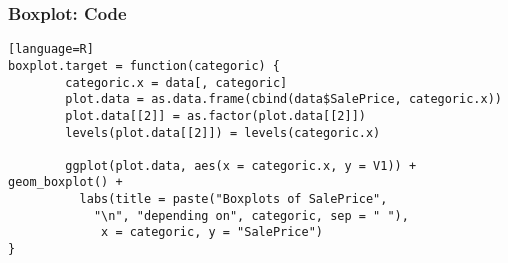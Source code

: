 \begin{frame}[fragile]
\frametitle{Boxplot: Code}

\begin{lstlisting}[basicstyle=\tiny][language=R]
boxplot.target = function(categoric) {
        categoric.x = data[, categoric]
        plot.data = as.data.frame(cbind(data$SalePrice, categoric.x))
        plot.data[[2]] = as.factor(plot.data[[2]])
        levels(plot.data[[2]]) = levels(categoric.x)
        
        ggplot(plot.data, aes(x = categoric.x, y = V1)) +			geom_boxplot() + 
          labs(title = paste("Boxplots of SalePrice", 
            "\n", "depending on", categoric, sep = " "), 
             x = categoric, y = "SalePrice")
}

\end{lstlisting}
\end{frame}






